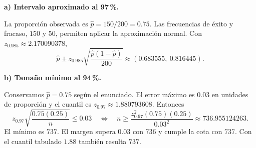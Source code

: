 \textbf{a) Intervalo aproximado al 97\,\%.}\par\nopagebreak[4]
La proporción observada es $\hat p=150/200=0.75$. Las frecuencias de éxito y fracaso, $150$ y $50$, permiten aplicar la aproximación normal. Con $z_{0.985}\approx2.170090378$,
\[
\hat p\pm z_{0.985}\sqrt{\frac{\hat p(1-\hat p)}{200}}
\approx\boxed{(0.683555,\ 0.816445)}.
\]

\textbf{b) Tamaño mínimo al 94\,\%.}\par\nopagebreak[4]
Conservamos $\hat p=0.75$ según el enunciado. El error máximo es $0.03$ en unidades de proporción y el cuantil es $z_{0.97}\approx1.880793608$. Entonces
\[
z_{0.97}\sqrt{\frac{0.75(0.25)}n}\le0.03
\quad\Longleftrightarrow\quad
n\ge\frac{z_{0.97}^2(0.75)(0.25)}{0.03^2}\approx736.955124263.
\]
El mínimo es $\boxed{737}$. El margen supera $0.03$ con $736$ y cumple la cota con $737$. Con el cuantil tabulado $1.88$ también resulta $737$.
